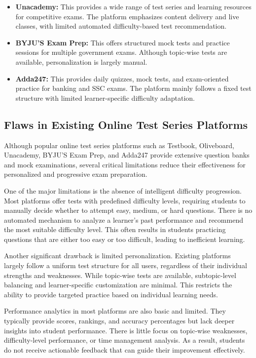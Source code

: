 \begin{sloppypar}
\begin{itemize}
    \item \textbf{Unacademy:} This provides a wide range of test series and learning resources for competitive exams. The platform emphasizes content delivery and live classes, with limited automated difficulty-based test recommendation.

    \item \textbf{BYJU'S Exam Prep:} This offers structured mock tests and practice sessions for multiple government exams. Although topic-wise tests are available, personalization is largely manual.

    \item \textbf{Adda247:} This provides daily quizzes, mock tests, and exam-oriented practice for banking and SSC exams. The platform mainly follows a fixed test structure with limited learner-specific difficulty adaptation.
\end{itemize}

\subsection{Flaws in Existing Online Test Series Platforms}

Although popular online test series platforms such as Testbook, Oliveboard, Unacademy, BYJU'S Exam Prep, and Adda247 provide extensive question banks and mock examinations, several critical limitations reduce their effectiveness for personalized and progressive exam preparation.

One of the major limitations is the absence of intelligent difficulty progression. Most platforms offer tests with predefined difficulty levels, requiring students to manually decide whether to attempt easy, medium, or hard questions. There is no automated mechanism to analyze a learner's past performance and recommend the most suitable difficulty level. This often results in students practicing questions that are either too easy or too difficult, leading to inefficient learning.

Another significant drawback is limited personalization. Existing platforms largely follow a uniform test structure for all users, regardless of their individual strengths and weaknesses. While topic-wise tests are available, subtopic-level balancing and learner-specific customization are minimal. This restricts the ability to provide targeted practice based on individual learning needs.

Performance analytics in most platforms are also basic and limited. They typically provide scores, rankings, and accuracy percentages but lack deeper insights into student performance. There is little focus on topic-wise weaknesses, difficulty-level performance, or time management analysis. As a result, students do not receive actionable feedback that can guide their improvement effectively.


\end{sloppypar}
